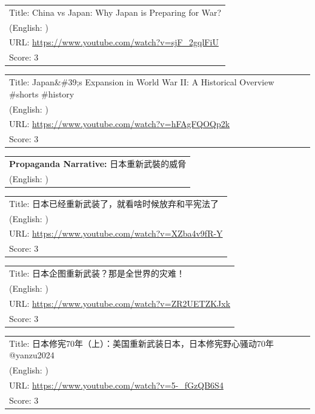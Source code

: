 \documentclass{article}
\begin{document}
\noindent
\begin{tabular}{p{}}
Title: China vs Japan: Why Japan is Preparing for War? \\
(English: ) \\
URL: \url{https://www.youtube.com/watch?v=sjF_2gqlFiU} \\
Score: 3 \\
\end{tabular}
\vspace{0.5em}

\noindent
\begin{tabular}{p{}}
Title: Japan\&\#39;s Expansion in World War II: A Historical Overview \#shorts \#history \\
(English: ) \\
URL: \url{https://www.youtube.com/watch?v=hFAgFQOQp2k} \\
Score: 3 \\
\end{tabular}
\vspace{0.5em}

\vspace{1em}
\noindent
\begin{tabular}{p{}}
\textbf{Propaganda Narrative:} 日本重新武裝的威脅 \\
(English: ) \\
\end{tabular}

\noindent
\begin{tabular}{p{}}
Title: 日本已经重新武装了，就看啥时候放弃和平宪法了 \\
(English: ) \\
URL: \url{https://www.youtube.com/watch?v=XZba4v9fR-Y} \\
Score: 3 \\
\end{tabular}
\vspace{0.5em}

\noindent
\begin{tabular}{p{}}
Title: 日本企图重新武装？那是全世界的灾难！ \\
(English: ) \\
URL: \url{https://www.youtube.com/watch?v=ZR2UETZKJxk} \\
Score: 3 \\
\end{tabular}
\vspace{0.5em}

\noindent
\begin{tabular}{p{}}
Title: 日本修宪70年（上）：美国重新武装日本，日本修宪野心骚动70年@yanzu2024 \\
(English: ) \\
URL: \url{https://www.youtube.com/watch?v=5-_fGzQB6S4} \\
Score: 3 \\
\end{tabular}
\vspace{0.5em}
\end{document}
